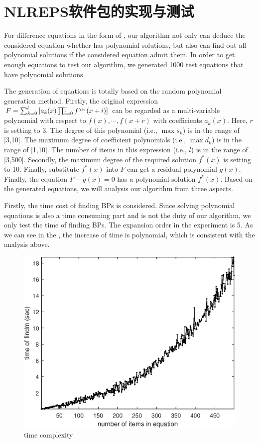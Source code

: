 \section{NLREPS软件包的实现与测试}

For difference equations in the form of , our algorithm not only can deduce the considered equation whether has polynomial solutions, but also can find out all polynomial solutions if the considered equation admit them. In order to get enough equations to test our algorithm, we generated 1000 test equations that have polynomial solutions.

The generation of equations is totally based on the random polynomial generation method. Firstly, the original expression $F=\sum_{k=0}^l{\left[a_k(x)\prod_{i=0}^r{f^{\gamma_{ki}}(x+i)}\right]}$ can be regarded as a multi-variable polynomial with respect to $f(x),\cdots,f(x+r)$ with coefficients $a_k(x)$. Here, $r$ is setting to 3. The degree of this polynomial (i.e., $\max s_k$) is in the range of [3,10]. The maximum degree of coefficient polynomials (i.e., $\max d_k$) is in the range of [1,10]. The number of items in this expression (i.e., $l$) is in the range of [3,500]. Secondly, the maximum degree of the required solution $f^*(x)$ is setting to 10. Finally, substitute $f^*(x)$ into $F$ can get a residual polynomial $g(x)$. Finally, the equation $F-g(x)=0$ has a polynomial solution $f^*(x)$. Based on the generated equations, we will analysis our algorithm from three aspects.

Firstly, the time cost of finding BPs is considered. Since solving polynomial equations is also a time consuming part and is not the duty of our algorithm, we only test the time of finding BPs. The expansion order in the experiment is 5. As we can see in the , the  increase of time is polynomial, which is consistent with the analysis above.
\begin{figure}[H]
\centering
\includegraphics[width=\figwidth]{fig/nlt.eps}
\caption{time complexity}
\label{t-findm}
\end{figure}

